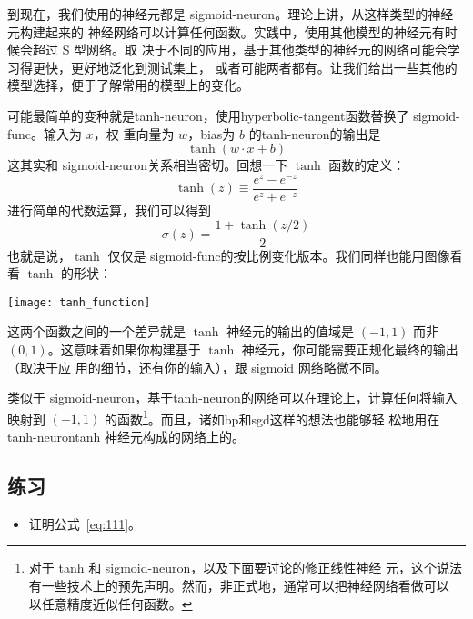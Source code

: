 到现在，我们使用的神经元都是 \gls*{sigmoid-neuron}。理论上讲，从这样类型的神经元构建起来的
神经网络可以计算任何函数。实践中，使用其他模型的神经元有时候会超过 S 型网络。取
决于不同的应用，基于其他类型的神经元的网络可能会学习得更快，更好地泛化到测试集上，
或者可能两者都有。让我们给出一些其他的模型选择，便于了解常用的模型上的变化。

可能最简单的变种就是\gls{tanh-neuron}，使用\gls{hyperbolic-tangent}函数替换了 \gls*{sigmoid-func}。输入为 $x$，权
重向量为 $w$，\gls*{bias}为 $b$ 的\gls*{tanh-neuron}的输出是
\begin{equation}
  \tanh(w \cdot x+b)
  \label{eq:109}\tag{109}
\end{equation}
这其实和 \gls*{sigmoid-neuron}关系相当密切。回想一下 $\tanh$ 函数的定义：
\begin{equation}
  \tanh(z) \equiv \frac{e^z-e^{-z}}{e^z+e^{-z}}
  \label{eq:110}\tag{110}
\end{equation}
进行简单的代数运算，我们可以得到
\begin{equation} 
  \sigma(z) = \frac{1+\tanh(z/2)}{2}
  \label{eq:111}\tag{111}
\end{equation}
也就是说，$\tanh$ 仅仅是 \gls*{sigmoid-func}的按比例变化版本。我们同样也能用图像看看
$\tanh$ 的形状：
\begin{center}
  \texttt{[image: tanh\_function]}
\end{center}

这两个函数之间的一个差异就是 $\tanh$ 神经元的输出的值域是 $(-1, 1)$ 而非 $(0,
1)$。这意味着如果你构建基于 $\tanh$ 神经元，你可能需要正规化最终的输出（取决于应
  用的细节，还有你的输入），跟 sigmoid 网络略微不同。

类似于 \gls*{sigmoid-neuron}，基于\gls*{tanh-neuron}的网络可以在理论上，计算任何将输入映射到
$(-1, 1)$ 的函数\footnote{对于 tanh 和 \gls*{sigmoid-neuron}，以及下面要讨论的修正线性神经
  元，这个说法有一些技术上的预先声明。然而，非正式地，通常可以把神经网络看做可以
  以任意精度近似任何函数。}。而且，诸如\gls*{bp}和\gls*{sgd}这样的想法也能够轻
松地用在\gls*{tanh-neuron}tanh 神经元构成的网络上的。

\subsection*{练习}

\begin{itemize}
\item 证明公式~\eqref{eq:111}。
\end{itemize}

